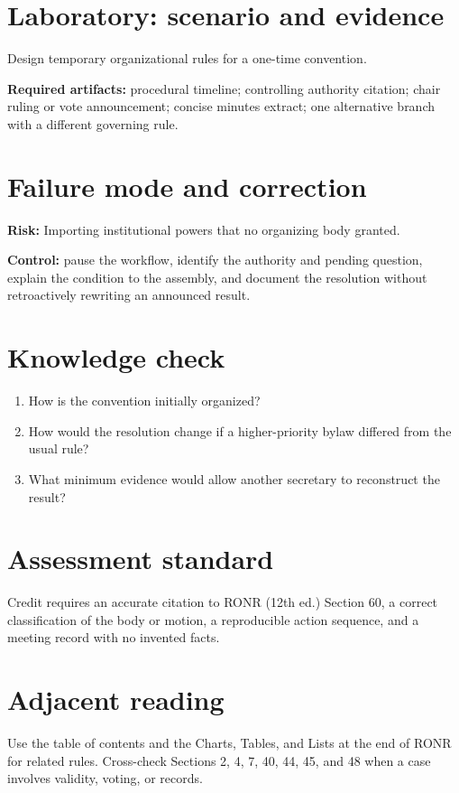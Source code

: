 \documentclass[11pt]{article}
\begin{document}
\section{Laboratory: scenario and evidence}
Design temporary organizational rules for a one-time convention.

\textbf{Required artifacts:} procedural timeline; controlling authority citation; chair ruling or vote announcement; concise minutes extract; one alternative branch with a different governing rule.

\section{Failure mode and correction}
\textbf{Risk:} Importing institutional powers that no organizing body granted.

\textbf{Control:} pause the workflow, identify the authority and pending question, explain the condition to the assembly, and document the resolution without retroactively rewriting an announced result.

\section{Knowledge check}
\begin{enumerate}[leftmargin=*,itemsep=4pt]
\item How is the convention initially organized?
\item How would the resolution change if a higher-priority bylaw differed from the usual rule?
\item What minimum evidence would allow another secretary to reconstruct the result?
\end{enumerate}

\section{Assessment standard}
Credit requires an accurate citation to RONR (12th ed.) Section 60, a correct classification of the body or motion, a reproducible action sequence, and a meeting record with no invented facts.

\section{Adjacent reading}
Use the table of contents and the Charts, Tables, and Lists at the end of RONR for related rules. Cross-check Sections 2, 4, 7, 40, 44, 45, and 48 when a case involves validity, voting, or records.
\end{document}
